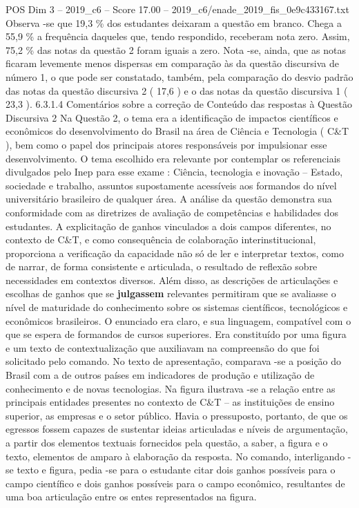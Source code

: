 \begin{textsample}{POS Dim 3 – 2019\_c6 – Score 17.00 – 2019\_c6/enade\_2019\_fis\_0e9c433167.txt}
Observa -se que 19,3 \% dos estudantes deixaram a questão em branco.
Chega a 55,9 \% a frequência daqueles que, tendo respondido, receberam nota zero.
Assim, 75,2 \% das notas da questão 2 foram iguais a zero.
Nota -se, ainda, que as notas ficaram levemente menos dispersas em comparação às da questão discursiva de número 1, o que pode ser constatado, também, pela comparação do desvio padrão das notas da questão discursiva 2 ( 17,6 ) e o das notas da questão discursiva 1 ( 23,3 ). 6.3.1.4 Comentários sobre a correção de Conteúdo das respostas à Questão Discursiva 2 Na Questão 2, o tema era a identificação de impactos científicos e econômicos do desenvolvimento do Brasil na área de Ciência e Tecnologia ( C\&T ), bem como o papel dos principais atores responsáveis por impulsionar esse desenvolvimento.
O tema escolhido era relevante por contemplar os referenciais divulgados pelo Inep para esse exame : Ciência, tecnologia e inovação – Estado, sociedade e trabalho, assuntos supostamente acessíveis aos formandos do nível universitário brasileiro de qualquer área.
A análise da questão demonstra sua conformidade com as diretrizes de avaliação de competências e habilidades dos estudantes.
A explicitação de ganhos vinculados a dois campos diferentes, no contexto de C\&T, e como consequência de colaboração interinstitucional, proporciona a verificação da capacidade não só de ler e interpretar textos, como de narrar, de forma consistente e articulada, o resultado de reflexão sobre necessidades em contextos diversos.
Além disso, as descrições de articulações e escolhas de ganhos que se \textbf{julgassem} relevantes permitiram que se avaliasse o nível de maturidade do conhecimento sobre os sistemas científicos, tecnológicos e econômicos brasileiros.
O enunciado era claro, e sua linguagem, compatível com o que se espera de formandos de cursos superiores.
Era constituído por uma figura e um texto de contextualização que auxiliavam na compreensão do que foi solicitado pelo comando.
No texto de apresentação, comparava -se a posição do Brasil com a de outros países em indicadores de produção e utilização de conhecimento e de novas tecnologias.
Na figura ilustrava -se a relação entre as principais entidades presentes no contexto de C\&T – as instituições de ensino superior, as empresas e o setor público.
Havia o pressuposto, portanto, de que os egressos fossem capazes de sustentar ideias articuladas e níveis de argumentação, a partir dos elementos textuais fornecidos pela questão, a saber, a figura e o texto, elementos de amparo à elaboração da resposta.
No comando, interligando -se texto e figura, pedia -se para o estudante citar dois ganhos possíveis para o campo científico e dois ganhos possíveis para o campo econômico, resultantes de uma boa articulação entre os entes representados na figura.

\end{textsample}
